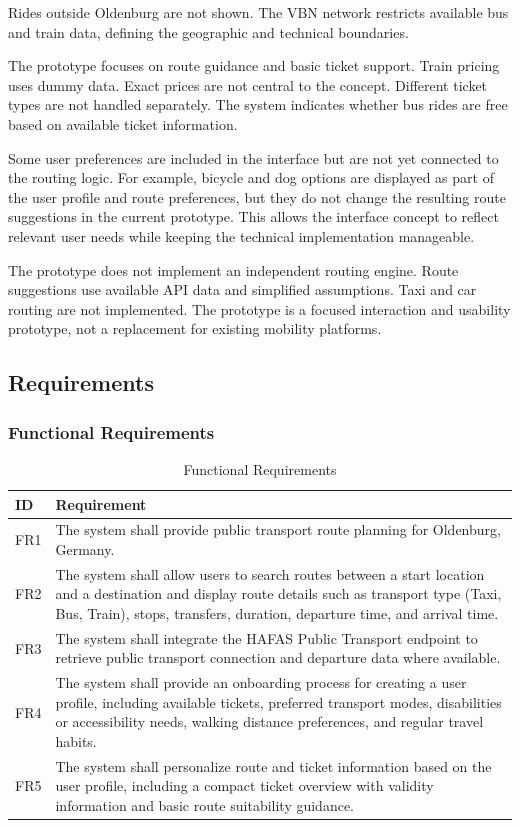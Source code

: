 \documentclass[12pt,a4paper]{article}
\begin{document}
Rides outside Oldenburg are not shown. The VBN network restricts available bus and train data, defining the geographic and technical boundaries.

The prototype focuses on route guidance and basic ticket support. Train pricing uses dummy data. Exact prices are not central to the concept. Different ticket types are not handled separately. The system indicates whether bus rides are free based on available ticket information.

Some user preferences are included in the interface but are not yet connected to the routing logic. For example, bicycle and dog options are displayed as part of the user profile and route preferences, but they do not change the resulting route suggestions in the current prototype. This allows the interface concept to reflect relevant user needs while keeping the technical implementation manageable.

The prototype does not implement an independent routing engine. Route suggestions use available API data and simplified assumptions. Taxi and car routing are not implemented. The prototype is a focused interaction and usability prototype, not a replacement for existing mobility platforms.


\subsection{Requirements}

\subsubsection{Functional Requirements}

\begin{table}[h]
\centering
\begin{tabular}{|p{2cm}|p{12cm}|}
\hline
\textbf{ID} & \textbf{Requirement} \\
\hline
FR1 & The system shall provide public transport route planning for Oldenburg, Germany. \\
\hline
FR2 & The system shall allow users to search routes between a start location and a destination and display route details such as transport type (Taxi, Bus, Train), stops, transfers, duration, departure time, and arrival time. \\
\hline
FR3 & The system shall integrate the HAFAS Public Transport endpoint to retrieve public transport connection and departure data where available. \\
\hline
FR4 & The system shall provide an onboarding process for creating a user profile, including available tickets, preferred transport modes, disabilities or accessibility needs, walking distance preferences, and regular travel habits. \\
\hline
FR5 & The system shall personalize route and ticket information based on the user profile, including a compact ticket overview with validity information and basic route suitability guidance. \\
\hline
\end{tabular}
\caption{Functional Requirements}
\label{tab:functional-requirements}
\end{table}
\end{document}
